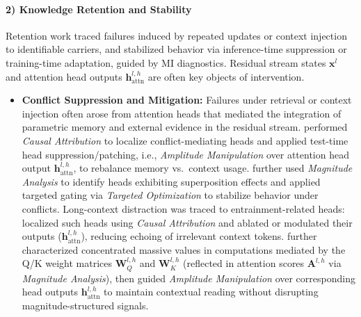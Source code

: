 \documentclass[11pt,letterpaper]{mystyle}
\begin{document}
  \paragraph{2) Knowledge Retention and Stability}
  Retention work traced failures induced by repeated updates or context injection to identifiable carriers, and stabilized behavior via inference-time suppression or training-time adaptation, guided by MI diagnostics. Residual stream states $\mathbf{x}^l$ and attention head outputs $\mathbf{h}_{\text{attn}}^{l,h}$ are often key objects of intervention.
  
  \begin{itemize}[leftmargin=*]
      \item \textbf{Conflict Suppression and Mitigation:}
      Failures under retrieval or context injection often arose from attention heads that mediated the integration of parametric memory and external evidence in the residual stream. 
      \citet{jin2024ph3} performed \textit{Causal Attribution} to localize conflict-mediating heads and applied test-time head suppression/patching, i.e., \textit{Amplitude Manipulation} over attention head output $\mathbf{h}_{\text{attn}}^{l,h}$, to rebalance memory vs.\ context usage. 
      \citet{li2025taming} further used \textit{Magnitude Analysis} to identify heads exhibiting superposition effects and applied targeted gating via \textit{Targeted Optimization} to stabilize behavior under conflicts. 
      Long-context distraction was traced to entrainment-related heads: \citet{niu-etal-2025-llama} localized such heads using \textit{Causal Attribution} and ablated or modulated their outputs ($\mathbf{h}_{\text{attn}}^{l,h}$), reducing echoing of irrelevant context tokens. 
      \citet{jin2025massivevalues} further characterized concentrated massive values in computations mediated by the Q/K weight matrices $\mathbf{W}_Q^{l,h}$ and $\mathbf{W}_K^{l,h}$ (reflected in attention scores $\mathbf{A}^{l,h}$ via \textit{Magnitude Analysis}), then guided \textit{Amplitude Manipulation} over corresponding head outputs $\mathbf{h}_{\text{attn}}^{l,h}$ to maintain contextual reading without disrupting magnitude-structured signals.
  

\end{itemize}
\end{document}
